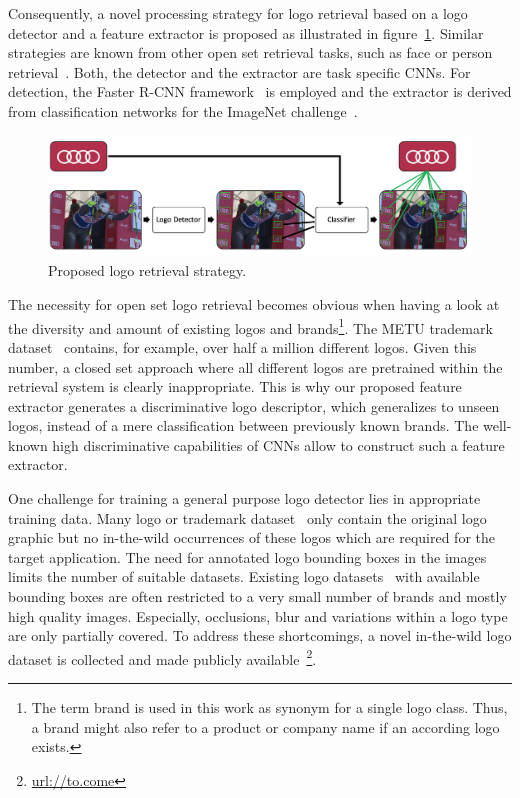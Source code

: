 \documentclass[a4paper,twoside]{article}
\begin{document}
Consequently, a novel processing strategy for logo retrieval based on a logo detector and a feature extractor is proposed as illustrated in figure~\ref{fig:pipeline}. Similar strategies are known from other open set retrieval tasks, such as face or person retrieval~\cite{bauml2010,herrmann2015b}. Both, the detector and the extractor are task specific \acp{CNN}. For detection, the Faster R-CNN framework~\cite{ren2015} is employed and the extractor is derived from classification networks for the ImageNet challenge~\cite{deng2009}.
%
\begin{figure}[t]
  \centering
  \includegraphics[width=\linewidth]{img/outline.png}
  \caption{Proposed logo retrieval strategy.}
  \label{fig:pipeline}
\end{figure}

The necessity for open set logo retrieval becomes obvious when having a look at the diversity and amount of existing logos and brands\footnote{The term brand is used in this work as synonym for a single logo class. Thus, a brand might also refer to a product or company name if an according logo exists.}. The METU trademark dataset~\cite{tursun2017} contains, for example, over half a million different logos. Given this number, a closed set approach where all different logos are pretrained within the retrieval system is clearly inappropriate.
This is why our proposed feature extractor generates a discriminative logo descriptor, which generalizes to unseen logos, instead of a mere classification between previously known brands. The well-known high discriminative capabilities of \acp{CNN} allow to construct such a feature extractor.

One challenge for training a general purpose logo detector lies in appropriate training data. Many logo or trademark dataset~\cite{eakins1998,tursun2017} only contain the original logo graphic but no in-the-wild occurrences of these logos which are required for the target application. The need for annotated logo bounding boxes in the images limits the number of suitable datasets. Existing logo datasets~\cite{joly2009,kalantidis2011,romberg2011,letessier2012,bianco2015,su2016,bianco2017} with available bounding boxes are often restricted to a very small number of brands and mostly high quality images. Especially, occlusions, blur and variations within a logo type are only partially covered.
To address these shortcomings, a novel in-the-wild logo dataset is collected and made publicly available~\footnote{\url{url://to.come}}.
\end{document}
